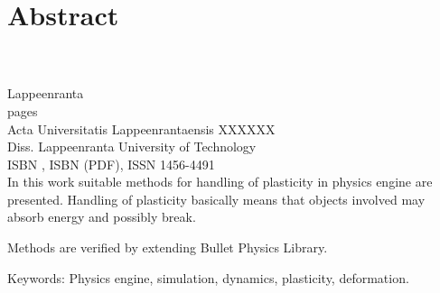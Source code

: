 \section*{Abstract}

\textbf{\myname}\\
\textbf{\mytitle}\\
Lappeenranta \myyear\\
\pageref{LastPage} pages\\
Acta Universitatis Lappeenrantaensis XXXXXX\\
Diss. Lappeenranta University of Technology\\
ISBN \myisbn, ISBN \mypdfisbn (PDF), ISSN 1456-4491\\

In this work suitable methods for handling of plasticity in physics engine are presented.
Handling of plasticity basically means that objects involved may absorb energy and possibly break.

Methods are verified by extending Bullet Physics Library. 

Keywords: Physics engine, simulation, dynamics, plasticity, deformation.

